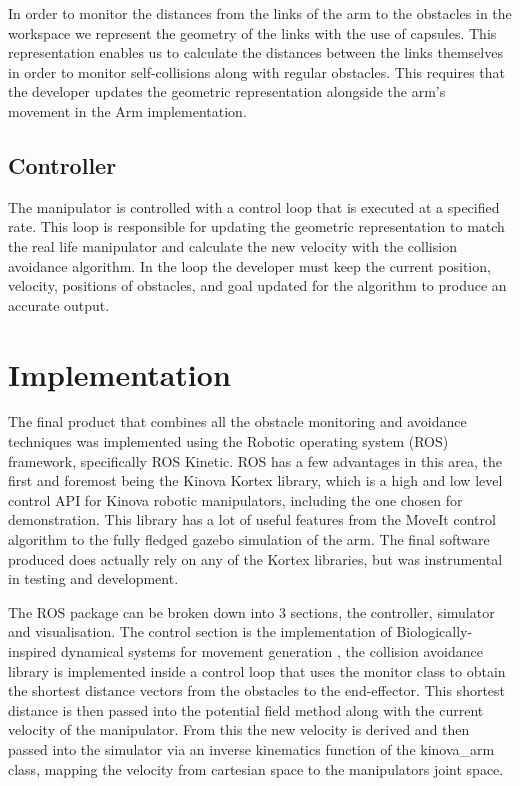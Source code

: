 \documentclass[a4paper, 10pt, conference]{ieeeconf}      %
\begin{document}
In order to monitor the distances from the links of the arm to the obstacles in the workspace we represent the geometry of the links with the use of capsules. This representation enables us to calculate the distances between the links themselves in order to monitor self-collisions along with regular obstacles. This requires that the developer updates the geometric representation alongside the arm’s movement in the Arm implementation. 

\subsection{Controller} %

The manipulator is controlled with a control loop that is executed at a specified rate. This loop is responsible for updating the geometric representation to match the real life manipulator and calculate the new velocity with the collision avoidance algorithm. In the loop the developer must keep the current position, velocity, positions of obstacles, and goal updated for the algorithm to produce an accurate output. 
 
 
\section{Implementation} %
The final product that combines all the obstacle monitoring and avoidance techniques was implemented using the Robotic operating system (ROS) framework, specifically ROS Kinetic. ROS has a few advantages in this area, the first and foremost being the Kinova Kortex library\cite{kortex}, which is a high and low level control API for Kinova robotic manipulators, including the one chosen for demonstration. This library has a lot of useful features from the MoveIt control algorithm to the fully fledged gazebo simulation of the arm. The final software produced does actually rely on any of the Kortex libraries, but was instrumental in testing and development.

The ROS package can be broken down into 3 sections, the controller, simulator and visualisation. The control section is the implementation of Biologically-inspired dynamical systems for movement generation \cite{Hoffmann}, the collision avoidance library is implemented inside a control loop that uses the monitor class to obtain the shortest distance vectors from the obstacles to the end-effector. This shortest distance is then passed into the potential field method along with the current velocity of the manipulator. From this the new velocity is derived and then passed into the simulator via an inverse kinematics function of the kinova\_arm class, mapping the velocity from cartesian space to the manipulators joint space.
\end{document}
